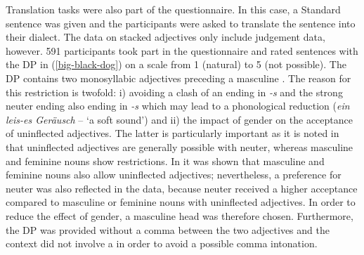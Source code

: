 \documentclass[output=paper,colorlinks,citecolor=brown]{langscibook}
\begin{document}
Translation tasks were also part of the questionnaire. In this case, a Standard  sentence was given and the participants were asked to translate the sentence into their dialect. The data on stacked adjectives only include judgement data, however. 591 participants took part in the questionnaire and rated sentences with the DP in (\ref{big-black-dog}) on a scale from 1 (natural) to 5 (not possible). The DP contains two monosyllabic adjectives preceding a masculine . The reason for this restriction is twofold: i) avoiding a clash of an  ending in \textit{-s} and the strong neuter ending also ending in \textit{-s} which may lead to a phonological reduction (\textit{ein leis-es Geräusch} -- `a soft sound') and ii) the impact of gender on the acceptance of uninflected adjectives. The latter is particularly important as it is noted in \citet{Staedele1927} that uninflected adjectives are generally possible with neuter, whereas masculine and feminine nouns show restrictions. In \citet{Rehn2019} it was shown that masculine and feminine nouns also allow uninflected adjectives; nevertheless, a preference for neuter was also reflected in the data, because neuter received a higher acceptance compared to masculine or feminine nouns with uninflected adjectives. In order to reduce the effect of gender, a masculine head  was therefore chosen. Furthermore, the DP was provided without a comma between the two adjectives and the context did not involve a  in order to avoid a possible comma intonation.

\ea \label{big-black-dog}
\z 
\z 
\end{document}
